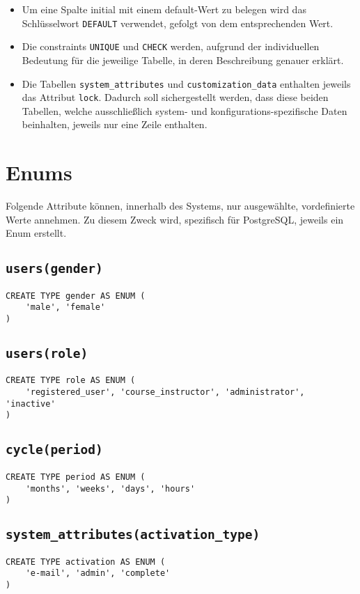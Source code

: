 \begin{itemize}
\item Um eine Spalte initial mit einem default-Wert zu belegen wird das Schlüsselwort \texttt{DEFAULT} verwendet, gefolgt von dem entsprechenden Wert.

\item Die constraints \texttt{UNIQUE} und \texttt{CHECK} werden, aufgrund der individuellen Bedeutung für die jeweilige Tabelle, in deren Beschreibung genauer erklärt.

\item Die Tabellen \texttt{system\_attributes} und \texttt{customization\_data} enthalten jeweils das Attribut \texttt{lock}. Dadurch soll sichergestellt werden, dass diese beiden Tabellen, welche ausschließlich system- und konfigurations-spezifische Daten beinhalten, jeweils nur eine Zeile enthalten.
\end{itemize}

\section{Enums}
Folgende Attribute können, innerhalb des Systems, nur ausgewählte, vordefinierte Werte annehmen. Zu diesem Zweck wird, spezifisch für PostgreSQL, jeweils ein Enum erstellt.

\subsection{\texttt{users(gender)}}

\begin{verbatim}
CREATE TYPE gender AS ENUM (
	'male', 'female'
)
\end{verbatim}

\subsection{\texttt{users(role)}}

\begin{verbatim}
CREATE TYPE role AS ENUM (
	'registered_user', 'course_instructor', 'administrator', 	'inactive'
)
\end{verbatim}

\subsection{\texttt{cycle(period)}}

\begin{verbatim}
CREATE TYPE period AS ENUM (
	'months', 'weeks', 'days', 'hours'
)
\end{verbatim}

\subsection{\texttt{system\_attributes(activation\_type)}}

\begin{verbatim}
CREATE TYPE activation AS ENUM (
	'e-mail', 'admin', 'complete'
)
\end{verbatim}
